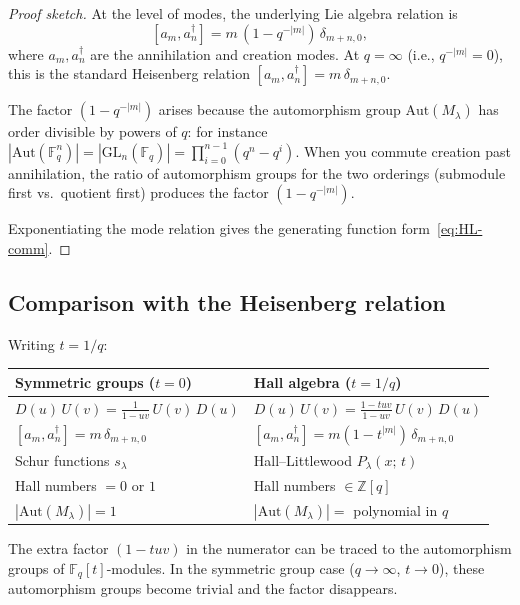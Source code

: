 \documentclass[12pt,a4paper]{article}
\theoremstyle{definition}
\theoremstyle{remark}
\newcommand{\Z}{\mathbb{Z}}
\newcommand{\F}{\mathbb{F}}
\newcommand{\GL}{\mathrm{GL}}
\begin{document}
\begin{proof}[Proof sketch]
At the level of modes, the underlying Lie algebra relation is
\[
  [a_m, a_n^\dagger] = m\,(1 - q^{-|m|})\,\delta_{m+n,0},
\]
where $a_m, a_n^\dagger$ are the annihilation and creation modes.
At $q = \infty$ (i.e., $q^{-|m|} = 0$), this is the standard
Heisenberg relation $[a_m, a_n^\dagger] = m\,\delta_{m+n,0}$.

The factor $(1 - q^{-|m|})$ arises because the automorphism group
$\mathrm{Aut}(M_\lambda)$ has order divisible by powers of $q$: for
instance $|\mathrm{Aut}(\F_q^n)| = |\GL_n(\F_q)| =
\prod_{i=0}^{n-1}(q^n - q^i)$. When you commute creation past
annihilation, the ratio of automorphism groups for the two orderings
(submodule first vs.\ quotient first) produces the factor
$(1 - q^{-|m|})$.

Exponentiating the mode relation gives the generating function
form~\eqref{eq:HL-comm}.
\end{proof}

\subsection{Comparison with the Heisenberg relation}

Writing $t = 1/q$:

\begin{center}
\renewcommand{\arraystretch}{1.5}
\begin{tabular}{@{}p{5cm}p{6cm}@{}}
\toprule
\textbf{Symmetric groups ($t = 0$)} & \textbf{Hall algebra ($t = 1/q$)} \\
\midrule
$D(u)\, U(v) = \frac{1}{1-uv}\, U(v)\, D(u)$
  & $D(u)\, U(v) = \frac{1-tuv}{1-uv}\, U(v)\, D(u)$ \\
$[a_m, a_n^\dagger] = m\,\delta_{m+n,0}$
  & $[a_m, a_n^\dagger] = m(1 - t^{|m|})\,\delta_{m+n,0}$ \\
Schur functions $s_\lambda$
  & Hall--Littlewood $P_\lambda(x;\, t)$ \\
Hall numbers $= 0$ or $1$
  & Hall numbers $\in \Z[q]$ \\
$|\mathrm{Aut}(M_\lambda)| = 1$
  & $|\mathrm{Aut}(M_\lambda)| = $ polynomial in $q$ \\
\bottomrule
\end{tabular}
\end{center}

The extra factor $(1 - tuv)$ in the numerator can be traced to the
automorphism groups of $\F_q[t]$-modules. In the symmetric group
case ($q \to \infty$, $t \to 0$), these automorphism groups become
trivial and the factor disappears.
\end{document}
